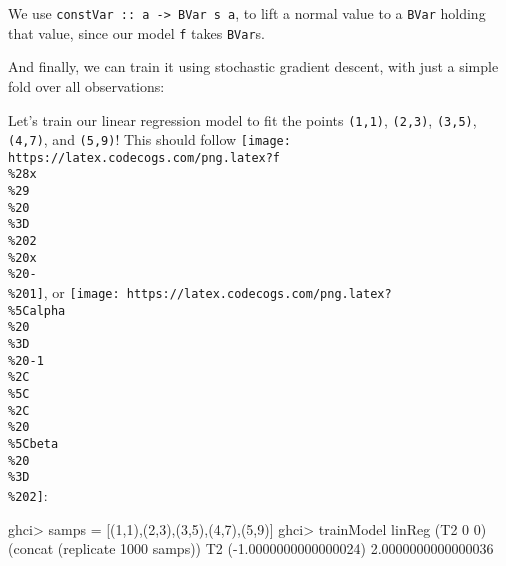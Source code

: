 \documentclass[]{article}
\newenvironment{Shaded}{}{}
\newcommand{\CommentTok}[1]{\textcolor[rgb]{0.38,0.63,0.69}{\textit{#1}}}
\newcommand{\DataTypeTok}[1]{\textcolor[rgb]{0.56,0.13,0.00}{#1}}
\newcommand{\DecValTok}[1]{\textcolor[rgb]{0.25,0.63,0.44}{#1}}
\newcommand{\FloatTok}[1]{\textcolor[rgb]{0.25,0.63,0.44}{#1}}
\newcommand{\FunctionTok}[1]{\textcolor[rgb]{0.02,0.16,0.49}{#1}}
\newcommand{\NormalTok}[1]{#1}
\newcommand{\OtherTok}[1]{\textcolor[rgb]{0.00,0.44,0.13}{#1}}
\begin{document}
We use \texttt{constVar\ ::\ a\ -\textgreater{}\ BVar\ s\ a}, to lift a normal
value to a \texttt{BVar} holding that value, since our model \texttt{f} takes
\texttt{BVar}s.

And finally, we can train it using stochastic gradient descent, with just a
simple fold over all observations:

\begin{Shaded}
\end{Shaded}

Let's train our linear regression model to fit the points \texttt{(1,1)},
\texttt{(2,3)}, \texttt{(3,5)}, \texttt{(4,7)}, and \texttt{(5,9)}! This should
follow
\texttt{[image: https://latex.codecogs.com/png.latex?f\\\%28x\\\%29\\\%20\\\%3D\\\%202\\\%20x\\\%20-\\\%201]},
or
\texttt{[image: https://latex.codecogs.com/png.latex?\\\%5Calpha\\\%20\\\%3D\\\%20-1\\\%2C\\\%5C\\\%2C\\\%20\\\%5Cbeta\\\%20\\\%3D\\\%202]}:

\begin{Shaded}
\begin{Highlighting}[]
\NormalTok{ghci}\FunctionTok{>}\NormalTok{ samps }\FunctionTok{=}\NormalTok{ [(}\DecValTok{1}\NormalTok{,}\DecValTok{1}\NormalTok{),(}\DecValTok{2}\NormalTok{,}\DecValTok{3}\NormalTok{),(}\DecValTok{3}\NormalTok{,}\DecValTok{5}\NormalTok{),(}\DecValTok{4}\NormalTok{,}\DecValTok{7}\NormalTok{),(}\DecValTok{5}\NormalTok{,}\DecValTok{9}\NormalTok{)]}
\NormalTok{ghci}\FunctionTok{>}\NormalTok{ trainModel linReg (}\DataTypeTok{T2} \DecValTok{0} \DecValTok{0}\NormalTok{) (concat (replicate }\DecValTok{1000}\NormalTok{ samps))}
\DataTypeTok{T2}\NormalTok{ (}\FunctionTok{-}\FloatTok{1.0000000000000024}\NormalTok{) }\FloatTok{2.0000000000000036}
\end{Highlighting}
\end{Shaded}
\end{document}
